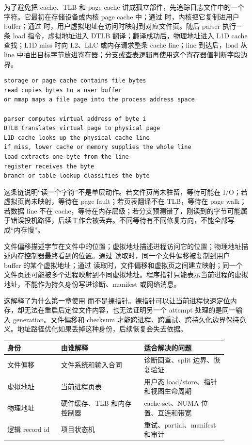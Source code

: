为了避免把 cache、TLB 和 page cache 讲成孤立部件，先追踪日志文件中的一个字符。它最初在存储设备或内核 page cache 中；通过  时，内核把它复制进用户 buffer；通过  时，用户虚拟地址在访问时映射到对应文件页。随后 parser 执行一条 load 指令，虚拟地址进入 DTLB 翻译；翻译成功后，物理地址进入 L1D cache 查找；L1D miss 时向 L2、LLC 或内存请求整条 cache line；line 到达后，load 从 line 中抽出目标字节放进寄存器；分支或查表逻辑再使用这个寄存器值判断字段边界。

\begin{lstlisting}[numbers=none,caption={一个输入字节到达寄存器的事件链}]
storage or page cache contains file bytes
read copies bytes to a user buffer
or mmap maps a file page into the process address space

parser computes virtual address of byte i
DTLB translates virtual page to physical page
L1D cache looks up the physical cache line
if miss, lower cache or memory supplies the whole line
load extracts one byte from the line
register receives the byte
branch or table lookup classifies the byte
\end{lstlisting}

这条链说明“读一个字符”不是单层动作。若文件页尚未驻留，等待可能在 I/O；若虚拟页尚未映射，等待在 page fault；若页表翻译不在 TLB，等待在 page walk；若数据 line 不在 cache，等待在内存层级；若分支预测错了，刚读到的字节可能属于错误投机路径，后续工作会被丢弃。不同等待有不同修复方向，不能全部写成“内存慢”。

文件偏移描述字节在文件中的位置；虚拟地址描述进程访问它的位置；物理地址描述内存控制器最终看到的位置。通过  读取时，同一个文件偏移被复制到用户 buffer 的某个虚拟地址；通过  读取时，文件偏移和虚拟页之间建立映射；同一个文件页还可能被多个进程映射到不同虚拟地址。程序指针只能表示当前进程的虚拟地址，不能作为持久身份写进诊断、manifest 或网络消息。

这解释了为什么第一章使用  而不是裸指针。裸指针可以让当前进程快速定位内存，却无法在重启后定位文件内容，也无法证明另一个 attempt 处理的是同一输入 generation。文件偏移和 checksum 才能跨进程、跨重试、跨持久化边界保持意义。地址路径优化如果丢掉这种身份，后续恢复会失去依据。

\begin{center}
\small
\begin{tabular}{@{}p{0.22\linewidth}p{0.34\linewidth}p{0.34\linewidth}@{}}
\toprule
身份 & 由谁解释 & 适合解决的问题 \\
\midrule
文件偏移 & 文件系统和输入合同 & 诊断回查、split 边界、恢复验证 \\
虚拟地址 & 当前进程页表 & 用户态 load/store、指针和视图生命周期 \\
物理地址 & 硬件缓存、TLB 和内存控制器 & cache set、NUMA 位置、互连和带宽 \\
逻辑 record id & 项目状态机 & 重试、partial、manifest 和审计 \\
\bottomrule
\end{tabular}
\end{center}

